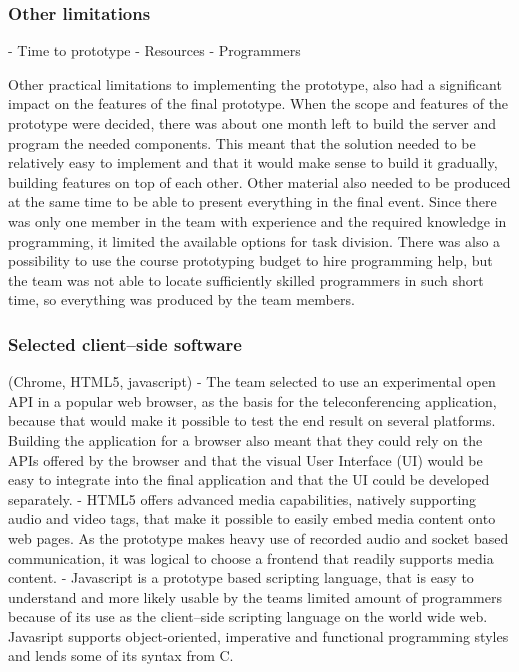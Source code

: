 \documentclass[english,12pt,a4paper,dvips]{article}
\begin{document}
\subsubsection{Other limitations}

- Time to prototype
- Resources
- Programmers

Other practical limitations to implementing the prototype, also had a significant impact on the features of the final prototype. When the scope and features of the prototype were decided, there was about one month left to build the server and program the needed components. This meant that the solution needed to be relatively easy to implement and that it would make sense to build it gradually, building features on top of each other. Other material also needed to be produced at the same time to be able to present everything in the final event. Since there was only one member in the team with experience and the required knowledge in programming, it limited the available options for task division. There was also a possibility to use the course prototyping budget to hire programming help, but the team was not able to locate sufficiently skilled programmers in such short time, so everything was produced by the team members.

\subsubsection{Selected client--side software}

(Chrome, HTML5, javascript)
- The team selected to use an experimental open API in a popular web browser, as the basis for the teleconferencing application, because that would make it possible to test the end result on several platforms. Building the application for a browser also meant that they could rely on the APIs offered by the browser and that the visual User Interface (UI) would be easy to integrate into the final application and that the UI could be developed separately.
- HTML5 offers advanced media capabilities, natively supporting audio and video tags, that make it possible to easily embed media content onto web pages. As the prototype makes heavy use of recorded audio and socket based communication, it was logical to choose a frontend that readily supports media content.
- Javascript is a prototype based scripting language, that is easy to understand and more likely usable by the teams limited amount of programmers because of its use as the client--side scripting language on the world wide web. Javasript supports object-oriented, imperative and functional programming styles and lends some of its syntax from C.
\end{document}
